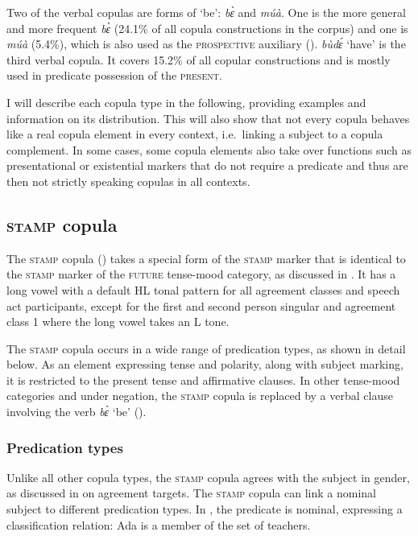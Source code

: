 Two of the verbal copulas are forms of `be': {\itshape bɛ̀} and {\itshape múà}. One is the more general and more frequent {\itshape bɛ̀} (24.1\% of all copula constructions in the corpus) and one is {\itshape múà} (5.4\%), which is also used as the \textsc{prospective} auxiliary (). {\itshape bùdɛ́} `have' is the third verbal copula. It covers 15.2\% of all copular constructions and is mostly used in predicate possession of the \textsc{present}.

I will describe each copula type in the following, providing examples and information on its distribution. This will also show that not every copula behaves like a real copula element in every context, i.e.\ linking a subject to a copula complement. In some cases, some copula elements also take over functions such as presentational or existential markers that do not require a predicate and thus are then not strictly speaking copulas in all contexts.


\subsection{\textsc{stamp} copula}
\label{sec:COP}

The \textsc{stamp} copula ({\COP}) takes a  special form of the \textsc{stamp} marker that is identical to the \textsc{stamp} marker of the \textsc{future} tense-mood category, as discussed in . It has a long vowel with a default HL tonal pattern for all agreement classes and speech act participants, except for the first and second person singular and agreement class 1 where the long vowel takes an L tone.

The \textsc{stamp} copula occurs in a wide range of predication types, as shown in detail below. As an element expressing tense and polarity, along with subject marking, it is restricted to the present tense and affirmative clauses. In other tense-mood categories and under negation, the \textsc{stamp} copula is replaced by a verbal clause involving the verb {\itshape bɛ̀} `be' (). 

\subsubsection*{Predication types} Unlike all other copula types, the \textsc{stamp} copula agrees with the subject in gender, as discussed in  on agreement targets. The \textsc{stamp} copula can link a nominal subject to different predication types. In , the predicate is nominal, expressing a classification relation: Ada is a member of the set of teachers.


